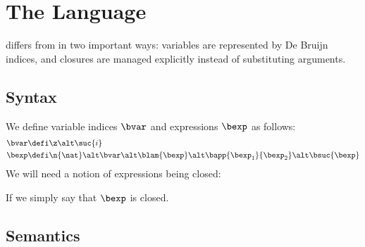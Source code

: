 \section{The \textnormal{\blang} Language}

\blang differs from \hlang in two important ways: variables are represented by De Bruijn indices, and closures are managed explicitly instead of substituting arguments.


\subsection{Syntax}

We define variable indices $\bvar$ and \blang expressions $\bexp$ as follows:
\begin{align*}
	\bvar &\defi \z \alt \suc{i} \\
	\bexp &\defi \n{\nat} \alt \bvar \alt \blam{\bexp} \alt \bapp{\bexp_1}{\bexp_2} \alt \bsuc{\bexp}
\end{align*}
We will need a notion of \blang expressions being closed:

\vspace{0.5cm}


\begin{prooftree}
\end{prooftree}

\begin{prooftree}
\end{prooftree}

\begin{prooftree}
\end{prooftree}

\begin{prooftree}
\end{prooftree}

\begin{prooftree}
\end{prooftree}

If  we simply say that $\bexp$ is closed.

\subsection{Semantics}

